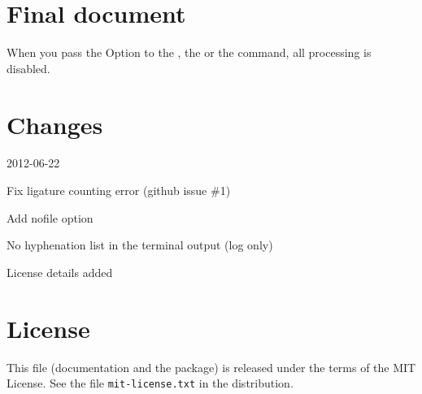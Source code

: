 \documentclass{ltxdockit}
\begin{document}
\begin{optionlist}
\end{optionlist}

\section{Final document}

When you pass the Option  to the , the  or the  command, all processing is disabled.

\section{Changes}
\begin{changelog}
 \begin{release}{0.2}{2012-06-22}
  \item Fix ligature counting error (github issue \#1)
  \item Add nofile option
  \item No hyphenation list in the terminal output (log only)
  \item License details added
 \end{release}
\end{changelog}

\section{License}

This file (documentation and the package) is released under the terms of the MIT License. See the file \texttt{mit-license.txt} in the distribution.


\end{document}
